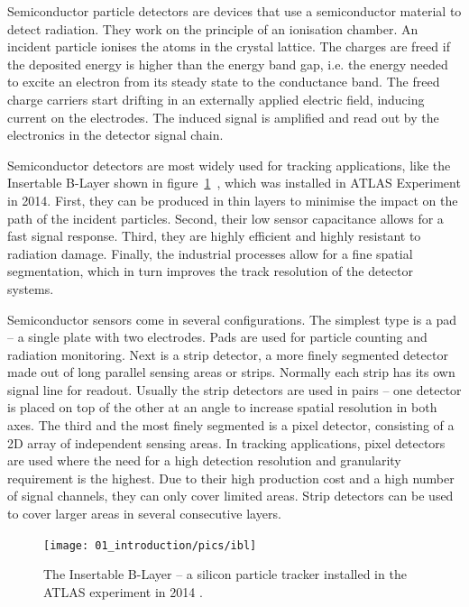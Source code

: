 Semiconductor particle detectors are devices that use a semiconductor material to detect radiation. They work on the principle of an ionisation chamber. An incident particle ionises the atoms in the crystal lattice. The charges are freed if the deposited energy is higher than the energy band gap, i.e. the energy needed to excite an electron from its steady state to the conductance band. The freed charge carriers start drifting in an externally applied electric field, inducing current on the electrodes. The induced signal is amplified and read out by the electronics in the detector signal chain.

Semiconductor detectors are most widely used for tracking applications, like the Insertable B-Layer shown in figure~\ref{fig:ibl}~\cite{Pernegger:1985432}, which was installed in ATLAS Experiment in 2014. First, they can be produced in thin layers to minimise the impact on the path of the incident particles. Second, their low sensor capacitance allows for a fast signal response. Third, they are highly efficient and highly resistant to radiation damage. Finally, the industrial processes allow for a fine spatial segmentation, which in turn improves the track resolution of the detector systems. 

Semiconductor sensors come in several configurations. The simplest type is a pad -- a single plate with two electrodes. Pads are used for particle counting and radiation monitoring. Next is a strip detector, a more finely segmented detector made out of long parallel sensing areas or strips. Normally each strip has its own signal line for readout. Usually the strip detectors are used in pairs -- one detector is placed on top of the other at an angle to increase spatial resolution in both axes. The third and the most finely segmented is a pixel detector, consisting of a 2D array of independent sensing areas. In tracking applications, pixel detectors are used where the need for a high detection resolution and granularity requirement is the highest. Due to their high production cost and a high number of signal channels, they can only cover limited areas. Strip detectors can be used to cover larger areas in several consecutive layers.

\begin{figure}[!t]
\centering
\texttt{[image: 01\_introduction/pics/ibl]}
\caption{The Insertable B-Layer -- a silicon particle tracker installed in the ATLAS experiment in 2014 \cite{MarcelloniDeOliveira:1702006}.}
\label{fig:ibl}
\end{figure}




